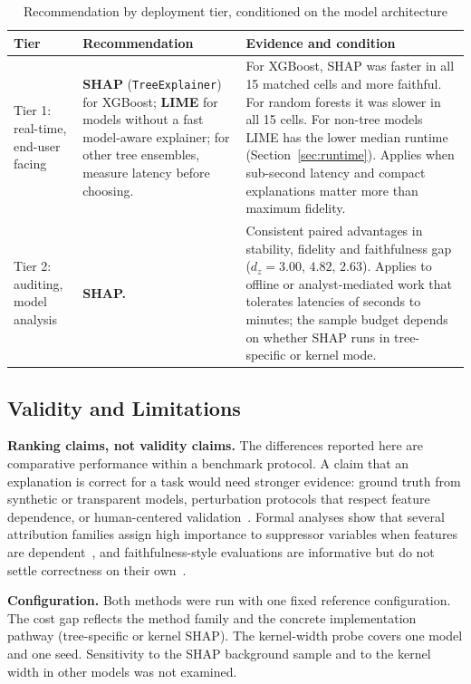 \documentclass[11pt,a4paper]{article}
\begin{document}
\begin{table}[htb]
\centering
\caption{Recommendation by deployment tier, conditioned on the model
architecture}
\label{tab:hybrid_deployment}
\begin{tabularx}{\linewidth}{p{2.4cm} >{\raggedright\arraybackslash}p{4.2cm} X}
\toprule
\textbf{Tier} & \textbf{Recommendation} & \textbf{Evidence and condition} \\
\midrule
Tier 1: real-time, end-user facing &
\textbf{SHAP} (\texttt{TreeExplainer}) for XGBoost; \textbf{LIME} for
models without a fast model-aware explainer; for other tree ensembles,
measure latency before choosing. &
For XGBoost, SHAP was faster in all 15 matched cells and more faithful.
For random forests it was slower in all 15 cells. For non-tree models LIME
has the lower median runtime (Section~\ref{sec:runtime}). Applies when
sub-second latency and compact explanations matter more than maximum
fidelity. \\[4pt]
Tier 2: auditing, model analysis &
\textbf{SHAP.} &
Consistent paired advantages in stability, fidelity and faithfulness gap
($d_z = 3.00$, $4.82$, $2.63$). Applies to offline or analyst-mediated work
that tolerates latencies of seconds to minutes; the sample budget depends
on whether SHAP runs in tree-specific or kernel mode. \\
\bottomrule
\end{tabularx}
\end{table}

\subsection{Validity and Limitations}
\label{sec:validity}

\textbf{Ranking claims, not validity claims.} The differences reported here
are comparative performance within a benchmark protocol. A claim that an
explanation is correct for a task would need stronger evidence: ground
truth from synthetic or transparent models, perturbation protocols that
respect feature dependence, or human-centered
validation~\cite{haufe2026formalization,doshivelez2017rigorous}. Formal
analyses show that several attribution families assign high importance to
suppressor variables when features are
dependent~\cite{wilming2022scrutinizing,wilming2023theoretical}, and
faithfulness-style evaluations are informative but do not settle
correctness on their own~\cite{jacovi2020faithfulness,rong2022consistent}.

\textbf{Configuration.} Both methods were run with one fixed reference
configuration. The cost gap reflects the method family and the concrete
implementation pathway (tree-specific or kernel SHAP). The kernel-width
probe covers one model and one seed. Sensitivity to the SHAP background
sample and to the kernel width in other models was not examined.
\end{document}
